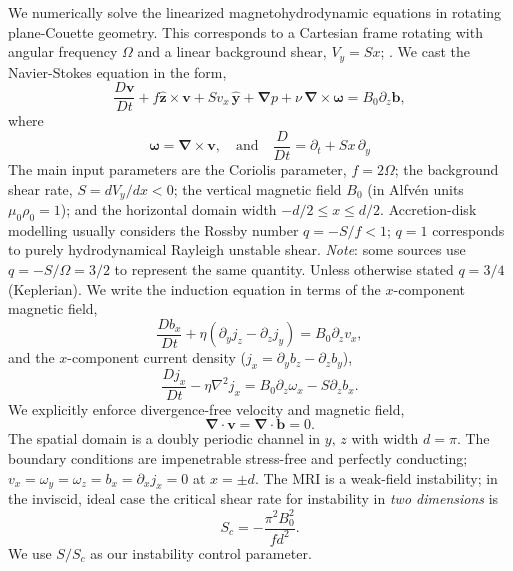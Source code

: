 \documentclass[aps,prl,reprint,superscriptaddress]{revtex4-1}
\newcommand{\SSC}{S/S_{c}}
\begin{document}
We numerically solve the linearized magnetohydrodynamic equations in rotating plane-Couette geometry.
This corresponds to a Cartesian frame rotating with angular frequency $\Omega$ and a linear background shear, $V_{y}=Sx$; \citep[see][]{2015RSPSA.47140699V}.
We cast the Navier-Stokes equation in the form,
\begin{equation}\label{eq:mhd}
\frac{D \boldsymbol{v}}{Dt}+f \boldsymbol{\hat{z}}\times\boldsymbol{v}+{S}v_{x}\,\boldsymbol{\hat{y}}+\boldsymbol{\nabla}{p}+\nu\,\boldsymbol{\nabla}\times\boldsymbol{\omega}=B_{0}\partial_{z}\boldsymbol{b},
\end{equation}
where
\begin{equation}
\boldsymbol{\omega}=\boldsymbol{\nabla}\times\boldsymbol{v},\quad\text{and}\quad\frac{D}{Dt}=\partial_{t}+{S}x\,\partial_{y}\end{equation}
The main input parameters are the Coriolis parameter, $f=2 \Omega$; the background shear rate, $S=dV_{y}/dx<0$;  the vertical magnetic field $B_{0}$ (in Alfv\'{e}n units $\mu_{0}\rho_{0}=1$); and the horizontal domain width $-d/2\le{x}\le d/2$.
Accretion-disk modelling usually considers the Rossby number $q=-S/f<1$; $q=1$ corresponds to purely hydrodynamical Rayleigh unstable shear.
\textit{Note}: some sources use $q=-S/\Omega=3/2$ to represent the same quantity. 
Unless otherwise stated $q=3/4$ (Keplerian).
We write the induction equation in terms of the $x$-component magnetic field,
\begin{equation}\label{eq:Bx}
\frac{Db_{x}}{Dt}+\eta(\partial_{y}j_{z}-\partial_{z}j_{y})=B_{0}\partial_{z}v_{x},
\end{equation}
and the $x$-component current density ($j_{x}=\partial_{y}b_{z}-\partial_{z}b_{y}$),
\begin{equation}\label{eq:Jx}
\frac{Dj_{x}}{Dt}-\eta\nabla^{2}j_{x}=B_{0}\partial_{z}\omega_{x}-S\partial_{z}b_{x}.
\end{equation}
We explicitly enforce divergence-free velocity and magnetic field,
\begin{equation}\label{eq:divu}
 \boldsymbol{\nabla}\cdot\boldsymbol{v}=\boldsymbol{\nabla}\cdot\boldsymbol{b}=0.
\end{equation}
The spatial domain is a doubly periodic channel in $y,\,z$ with width $d=\pi$. 
The boundary conditions are impenetrable stress-free and perfectly conducting; $v_{x}=\omega_{y}=\omega_{z}=b_{x}=\partial_{x}j_{x}=0$ at $x=\pm{d}$. 
The MRI is a weak-field instability; in the inviscid, ideal case the critical shear rate for instability in \textit{two dimensions} is
\begin{equation}\label{eq:Sc}
  S_{c}=-\frac{\pi^{2}B_{0}^2}{fd^2}.
\end{equation}
We use $\SSC$ as our instability control parameter. 
\end{document}
